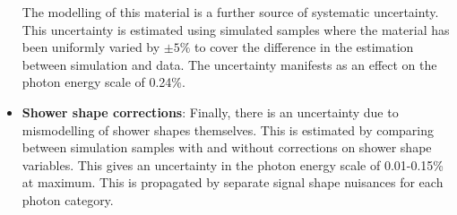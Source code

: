 \begin{itemize}[noitemsep]
{           The modelling of this material is a further source of systematic uncertainty. 
           This uncertainty is estimated using simulated samples where the material has been uniformly varied by $\pm5\%$ to cover the difference in the estimation between simulation and data.
           The uncertainty manifests as an effect on the photon energy scale of 0.24\%.
           }
    \item {\textbf{Shower shape corrections}: 
           Finally, there is an uncertainty due to mismodelling of shower shapes themselves. This is estimated by comparing between simulation samples with and without corrections on shower shape variables. This gives an uncertainty in the photon energy scale of 0.01-0.15\% at maximum. This is propagated by separate signal shape nuisances for each photon category.  
           }
\end{itemize}

